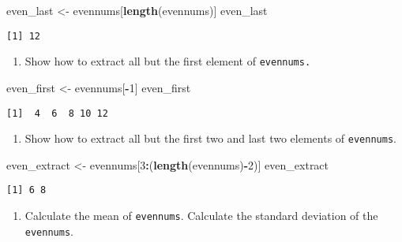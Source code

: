 \documentclass[
]{article}
\newenvironment{Shaded}{\begin{snugshade}}{\end{snugshade}}
\newcommand{\DecValTok}[1]{\textcolor[rgb]{0.00,0.00,0.81}{#1}}
\newcommand{\FunctionTok}[1]{\textcolor[rgb]{0.13,0.29,0.53}{\textbf{#1}}}
\newcommand{\NormalTok}[1]{#1}
\newcommand{\OtherTok}[1]{\textcolor[rgb]{0.56,0.35,0.01}{#1}}
\newcommand{\SpecialCharTok}[1]{\textcolor[rgb]{0.81,0.36,0.00}{\textbf{#1}}}
\providecommand{\tightlist}{%
  \setlength{\itemsep}{0pt}\setlength{\parskip}{0pt}}
\begin{document}
\begin{Shaded}
\begin{Highlighting}[]
\NormalTok{even\_last }\OtherTok{\textless{}{-}}\NormalTok{ evennums[}\FunctionTok{length}\NormalTok{(evennums)]}
\NormalTok{even\_last}
\end{Highlighting}
\end{Shaded}

\begin{verbatim}
[1] 12
\end{verbatim}

\begin{enumerate}
\def\labelenumi{\alph{enumi}.}
\setcounter{enumi}{2}
\tightlist
\item
  Show how to extract all but the first element of \texttt{evennums.}
\end{enumerate}

\begin{Shaded}
\begin{Highlighting}[]
\NormalTok{even\_first }\OtherTok{\textless{}{-}}\NormalTok{ evennums[}\SpecialCharTok{{-}}\DecValTok{1}\NormalTok{]}
\NormalTok{even\_first }
\end{Highlighting}
\end{Shaded}

\begin{verbatim}
[1]  4  6  8 10 12
\end{verbatim}

\begin{enumerate}
\def\labelenumi{\alph{enumi}.}
\setcounter{enumi}{3}
\tightlist
\item
  Show how to extract all but the first two and last two elements of
  \texttt{evennums}.
\end{enumerate}

\begin{Shaded}
\begin{Highlighting}[]
\NormalTok{even\_extract }\OtherTok{\textless{}{-}}\NormalTok{ evennums[}\DecValTok{3}\SpecialCharTok{:}\NormalTok{(}\FunctionTok{length}\NormalTok{(evennums)}\SpecialCharTok{{-}}\DecValTok{2}\NormalTok{)]}
\NormalTok{even\_extract}
\end{Highlighting}
\end{Shaded}

\begin{verbatim}
[1] 6 8
\end{verbatim}

\begin{enumerate}
\def\labelenumi{\alph{enumi}.}
\setcounter{enumi}{4}
\tightlist
\item
  Calculate the mean of \texttt{evennums}. Calculate the standard
  deviation of the \texttt{evennums}.
\end{enumerate}
\end{document}
